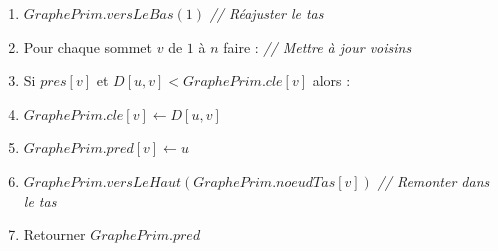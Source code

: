 \documentclass[a4paper, 12pt]{article}
\begin{document}
\begin{tcolorbox}[colback=darkWhite!75!white,colframe=black!30,left=5pt,right=5pt,top=5pt,bottom=5pt]
\begin{enumerate}
    \item \quad \quad $GraphePrim.versLeBas(1)$ \textit{// Réajuster le tas}
    \item \quad Pour chaque sommet $v$ de $1$ à $n$ faire : \textit{// Mettre à jour voisins}
    \item \quad \quad Si $pres[v]$ et $D[u, v] < GraphePrim.cle[v]$ alors :
    \item \quad \quad \quad $GraphePrim.cle[v] \leftarrow D[u, v]$
    \item \quad \quad \quad $GraphePrim.pred[v] \leftarrow u$
    \item \quad \quad \quad $GraphePrim.versLeHaut(GraphePrim.noeudTas[v])$ \textit{// Remonter dans le tas}
    \item Retourner $GraphePrim.pred$
\end{enumerate}
\end{tcolorbox}

\vspace{5mm}
\end{document}
